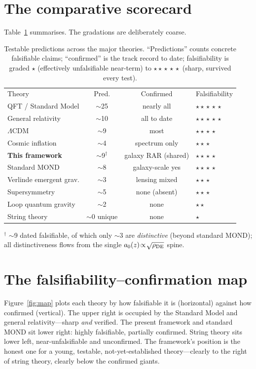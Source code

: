 \documentclass[aps,prd,twocolumn,10pt,nofootinbib]{revtex4-2}
\begin{document}
\section{The comparative scorecard}
Table~\ref{tab:score} summarises. The gradations are deliberately coarse.

\begin{table}[t]
\caption{Testable predictions across the major theories. ``Predictions'' counts concrete falsifiable claims;
``confirmed'' is the track record to date; falsifiability is graded $\star$ (effectively unfalsifiable near-term) to
$\star\!\star\!\star\!\star\!\star$ (sharp, survived every test).}
\label{tab:score}
\begin{ruledtabular}
\begin{tabular}{lccl}
Theory & Pred. & Confirmed & Falsifiability \\
\colrule
QFT / Standard Model & $\sim$25 & nearly all & $\star\!\star\!\star\!\star\!\star$ \\
General relativity & $\sim$10 & all to date & $\star\!\star\!\star\!\star\!\star$ \\
$\Lambda$CDM & $\sim$9 & most & $\star\!\star\!\star\!\star$ \\
Cosmic inflation & $\sim$4 & spectrum only & $\star\!\star\!\star$ \\
\textbf{This framework} & $\sim$9$^\dagger$ & galaxy RAR (shared) & $\star\!\star\!\star\!\star$ \\
Standard MOND & $\sim$8 & galaxy-scale yes & $\star\!\star\!\star\!\star$ \\
Verlinde emergent grav. & $\sim$3 & lensing mixed & $\star\!\star\!\star$ \\
Supersymmetry & $\sim$5 & none (absent) & $\star\!\star\!\star$ \\
Loop quantum gravity & $\sim$2 & none & $\star\!\star$ \\
String theory & $\sim$0 unique & none & $\star$ \\
\end{tabular}
\end{ruledtabular}
\footnotesize $^\dagger$ $\sim$9 dated falsifiable, of which only $\sim$3 are \emph{distinctive} (beyond standard
MOND); all distinctiveness flows from the single $a_0(z)\!\propto\!\sqrt{\rho_{\rm DE}}$ spine.
\end{table}

\section{The falsifiability--confirmation map}
Figure~\ref{fig:map} plots each theory by how falsifiable it is (horizontal) against how confirmed (vertical). The
upper right is occupied by the Standard Model and general relativity---sharp \emph{and} verified. The present
framework and standard MOND sit lower right: highly falsifiable, partially confirmed. String theory sits lower
left, near-unfalsifiable and unconfirmed. The framework's position is the honest one for a young, testable,
not-yet-established theory---clearly to the right of string theory, clearly below the confirmed giants.
\end{document}
